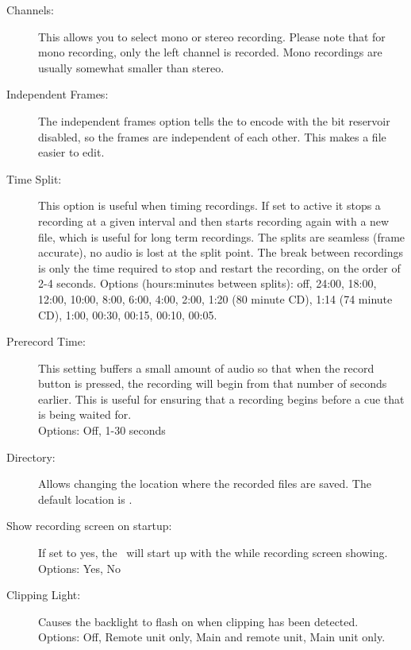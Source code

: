 {\begin{description}
  \item[Channels:]
    This allows you to select mono or stereo recording. Please note that 
    for mono recording, only the left channel is recorded.  Mono recordings
    are usually somewhat smaller than stereo.
    
  \item[Independent Frames:]
    The independent frames option tells the \dap to encode with the bit
    reservoir disabled, so the frames are independent of each other. This
    makes a file easier to edit.
    
  \item[Time Split:]
    This option is useful when timing recordings. If set to active it stops 
    a recording at a given interval and then starts recording again with a 
    new file, which is useful for long term recordings.
    \newline
    The splits are seamless (frame accurate), no audio is lost at the split 
    point. The break between recordings is only the time required to stop
    and restart the recording, on the order of 2-4 seconds.
    \newline
    Options (hours:minutes between splits): off, 24:00, 18:00, 12:00, 10:00, 
    8:00, 6:00, 4:00, 2:00, 1:20 (80 minute CD), 1:14 (74 minute  CD), 1:00, 
    00:30, 00:15, 00:10, 00:05.
    
  \item[Prerecord Time:]
    This setting buffers a small amount of audio so that when the record button 
    is pressed, the recording will begin from that number of seconds earlier.
    This is useful for ensuring that a recording begins before a cue that is
    being waited for.\\
    Options: Off, 1-30 seconds
    
  \item[Directory:]
    Allows changing the location where the recorded files are saved. The
    default location is .
    
  \item[Show recording screen on startup:]
    If set to yes, the \dap\ will start up with the while recording screen showing.\\
    Options: Yes, No\\
    
  \item[Clipping Light:]
    Causes the backlight to flash on when clipping has been detected.\\
    Options: Off, Remote unit only, Main and remote unit, Main unit only.
    
  \end{description}
}
 

